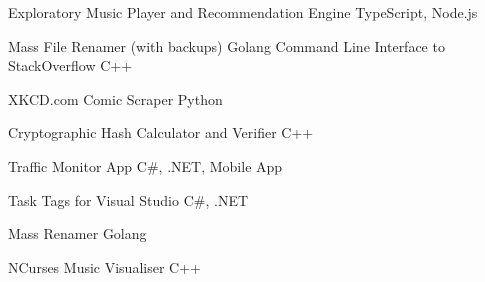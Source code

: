 
\begin{projentries}

\projentry%
  {Exploratory Music Player and Recommendation Engine} %
  {TypeScript, Node.js} %
  {} %
  {}

\projentry%
  {Mass File Renamer (with backups)} %
  {Golang} %
  {} %
  {Command Line Interface to StackOverflow} %
  {C++} %
  {} %
  {}

\projentry%
  {XKCD.com Comic Scraper} %
  {Python} %
  {} %
  {}

\projentry%
  {Cryptographic Hash Calculator and Verifier} %
  {C++} %
  {} %
  {}

\projentry%
  {Traffic Monitor App} %
  {C\#, .NET, Mobile App} %
  {} %
  {}

\projentry%
  {Task Tags for Visual Studio} %
  {C\#, .NET} %
  {} %
  {}

\projentry%
  {Mass Renamer} %
  {Golang} %
  {} %
  {}


\projentry%
  {NCurses Music Visualiser} %
  {C++} %
  {} %
  {}


\end{projentries}
